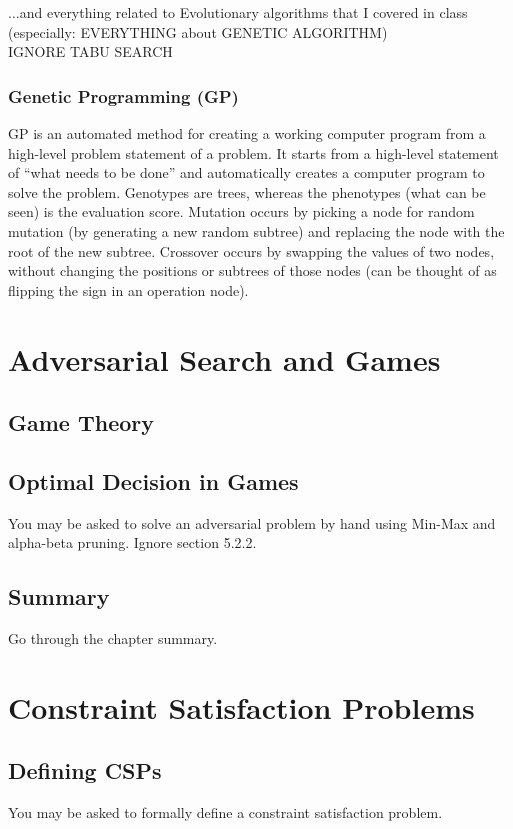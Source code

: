 \documentclass[exam={Midterm},color=true]{cs581exam}
\begin{document}
$\dots$and everything related to Evolutionary algorithms that I covered in class (especially: EVERYTHING about GENETIC ALGORITHM)\\
IGNORE TABU SEARCH

\subsubsection{Genetic Programming (GP)}\label{subsubsec:genetic-programming} %
GP is an automated method for creating a working computer program from a high-level problem statement of a problem.
It starts from a high-level statement of ``what needs to be done'' and automatically creates a computer program to solve the problem.
Genotypes are trees, whereas the phenotypes (what can be seen) is the evaluation score.
Mutation occurs by picking a node for random mutation (by generating a new random subtree) and replacing the node with the root of the new subtree.
Crossover occurs by swapping the values of two nodes, without changing the positions or subtrees of those nodes (can be thought of as flipping the sign in an operation node).

\section{Adversarial Search and Games}\label{sec:adversarial-search-and-games}
\subsection{Game Theory}\label{subsec:5.1}
\subsection{Optimal Decision in Games}\label{subsec:5.2}
You may be asked to solve an adversarial problem by hand using Min-Max
and alpha-beta pruning. Ignore section 5.2.2.
\subsection{Summary}\label{subsec:5-summary}
Go through the chapter summary.

\section{Constraint Satisfaction Problems}\label{sec:constraint-satisfaction-problems}
\subsection{Defining CSPs}\label{subsec:6.1}
You may be asked to formally define a constraint satisfaction problem.
\end{document}
